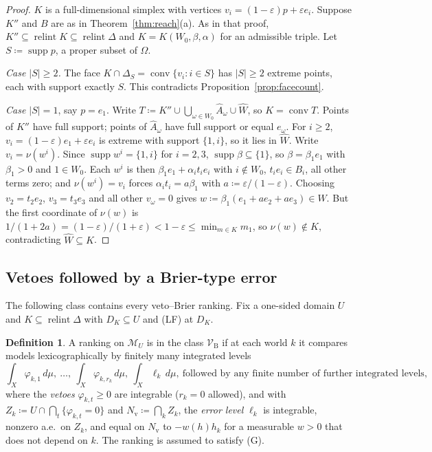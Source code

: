 \documentclass[11pt]{article}
\newcommand{\M}{\mathcal{M}}
\newcommand{\VBB}{\mathcal{V}_{\mathrm B}}
\DeclareMathOperator{\conv}{conv}
\DeclareMathOperator{\relint}{relint}
\DeclareMathOperator{\supp}{supp}
\theoremstyle{plain}
\theoremstyle{definition}
\newtheorem{definition}[theorem]{Definition}
\theoremstyle{remark}
\begin{document}
\begin{proof}
$K$ is a full-dimensional simplex with vertices $v_i=(1-\varepsilon)p+\varepsilon e_i$.
Suppose $K''$ and $B$ are as in Theorem~\ref{thm:reach}(a). As in that proof, $K''\subseteq
\relint K\subseteq\relint\Delta$ and $K=K(W_0,\beta,\alpha)$ for an admissible triple. Let
$S\coloneqq\supp p$, a proper subset of $\Omega$.

\emph{Case $|S|\ge2$.} The face $K\cap\Delta_S=\conv\{v_i:i\in S\}$ has $|S|\ge2$ extreme
points, each with support exactly $S$. This contradicts Proposition~\ref{prop:facecount}.

\emph{Case $|S|=1$}, say $p=e_1$. Write $T\coloneqq K''\cup\bigcup_{\omega\in W_0}\hat
A_\omega\cup\hat W$, so $K=\conv T$. Points of $K''$ have full support; points of $\hat
A_\omega$ have full support or equal $e_\omega$. For $i\ge2$, $v_i=(1-\varepsilon)e_1+
\varepsilon e_i$ is extreme with support $\{1,i\}$, so it lies in $\hat W$. Write
$v_i=\nu(w^i)$. Since $\supp w^i=\{1,i\}$ for $i=2,3$, $\supp\beta\subseteq\{1\}$, so
$\beta=\beta_1e_1$ with $\beta_1>0$ and $1\in W_0$. Each $w^i$ is then $\beta_1e_1+\alpha_i
t_ie_i$ with $i\notin W_0$, $t_ie_i\in B_i$, all other terms zero; and $\nu(w^i)=v_i$
forces $\alpha_it_i=a\beta_1$ with $a\coloneqq\varepsilon/(1-\varepsilon)$. Choosing
$v_2=t_2e_2$, $v_3=t_3e_3$ and all other $v_\omega=0$ gives $w\coloneqq\beta_1(e_1+ae_2+
ae_3)\in W$. But the first coordinate of $\nu(w)$ is $1/(1+2a)=(1-\varepsilon)/
(1+\varepsilon)<1-\varepsilon\le\min_{m\in K}m_1$, so $\nu(w)\notin K$, contradicting
$\hat W\subseteq K$.
\end{proof}

\subsection{Vetoes followed by a Brier-type error}\label{sec:excl-veto}

The following class contains every veto--Brier ranking. Fix a one-sided domain $U$ and
$K\subseteq\relint\Delta$ with $D_K\subseteq U$ and (LF) at $D_K$.

\begin{definition}\label{def:VB}
A ranking on $\M_U$ is in the class $\VBB$ if at each world $k$ it compares models
lexicographically by finitely many integrated levels
\[
  \int_X\varphi_{k,1}\,d\mu,\ \dots,\ \int_X\varphi_{k,r_k}\,d\mu,\ \int_X\ell_k\,d\mu,\
  \text{followed by any finite number of further integrated levels},
\]
where the \emph{vetoes} $\varphi_{k,t}\ge0$ are integrable ($r_k=0$ allowed), and with
$Z_k\coloneqq U\cap\bigcap_t\{\varphi_{k,t}=0\}$ and $N_{\mathrm v}\coloneqq\bigcap_kZ_k$,
the \emph{error level} $\ell_k$ is integrable, nonzero a.e.\ on $Z_k$, and equal on
$N_{\mathrm v}$ to $-w(h)h_k$ for a measurable $w>0$ that does not depend on $k$. The
ranking is assumed to satisfy (G).
\end{definition}
\end{document}
